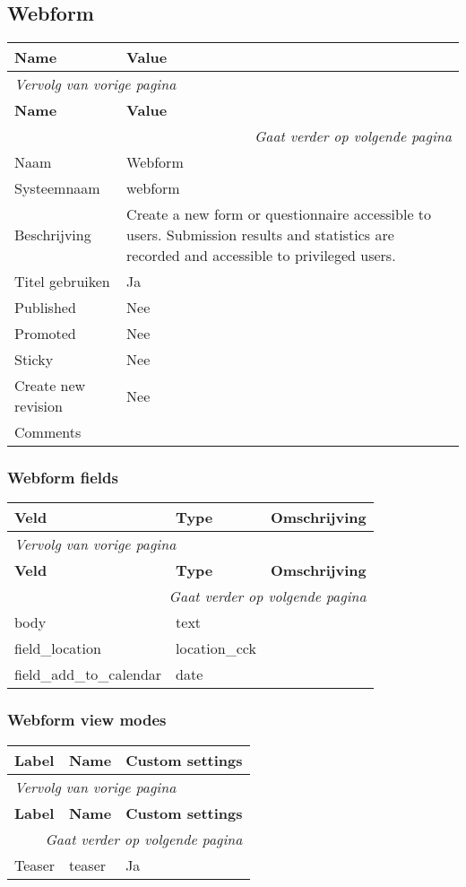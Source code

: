 \subsection{Webform}
\label{sec:content-webform}
  \begin{longtable}{| p{7.50cm}|p{7.50cm}|}
  \hline
  \rowcolor{tableheader}
  \textbf{Name} & \textbf{Value}  \tabularnewline
  \hline
\endfirsthead
\multicolumn{2}{l}{\textit{Vervolg van vorige pagina}} \\
\hline
\rowcolor{tableheader}
  \textbf{Name} & \textbf{Value}  \tabularnewline
  \hline
\hline
\endhead
\multicolumn{2}{r}{\textit{Gaat verder op volgende pagina}} \\
\endfoot
\hline
\endlastfoot
  Naam & Webform  \tabularnewline
  \hline
  Systeemnaam & webform  \tabularnewline
  \hline
  Beschrijving & Create a new form or questionnaire accessible to users. Submission results and statistics are recorded and accessible to privileged users.  \tabularnewline
  \hline
  Titel gebruiken & Ja  \tabularnewline
  \hline
  Published & Nee  \tabularnewline
  \hline
  Promoted & Nee  \tabularnewline
  \hline
  Sticky & Nee  \tabularnewline
  \hline
  Create new revision & Nee  \tabularnewline
  \hline
  Comments &   \tabularnewline
  \hline
  \end{longtable}

\subsubsection{Webform fields}
  \begin{longtable}{| p{5.00cm}|p{5.00cm}|p{5.00cm}|}
  \hline
  \rowcolor{tableheader}
  \textbf{Veld} & \textbf{Type} & \textbf{Omschrijving}  \tabularnewline
  \hline
\endfirsthead
\multicolumn{3}{l}{\textit{Vervolg van vorige pagina}} \\
\hline
\rowcolor{tableheader}
  \textbf{Veld} & \textbf{Type} & \textbf{Omschrijving}  \tabularnewline
  \hline
\hline
\endhead
\multicolumn{3}{r}{\textit{Gaat verder op volgende pagina}} \\
\endfoot
\hline
\endlastfoot
  body & text &   \tabularnewline
  \hline
  field\_location & location\_cck &   \tabularnewline
  \hline
  field\_add\_to\_calendar & date &   \tabularnewline
  \hline
  \end{longtable}

\subsubsection{Webform view modes}
  \begin{longtable}{| p{5.00cm}|p{5.00cm}|p{5.00cm}|}
  \hline
  \rowcolor{tableheader}
  \textbf{Label} & \textbf{Name} & \textbf{Custom settings}  \tabularnewline
  \hline
\endfirsthead
\multicolumn{3}{l}{\textit{Vervolg van vorige pagina}} \\
\hline
\rowcolor{tableheader}
  \textbf{Label} & \textbf{Name} & \textbf{Custom settings}  \tabularnewline
  \hline
\hline
\endhead
\multicolumn{3}{r}{\textit{Gaat verder op volgende pagina}} \\
\endfoot
\hline
\endlastfoot
  Teaser & teaser & Ja  \tabularnewline
  \hline
  \end{longtable}

